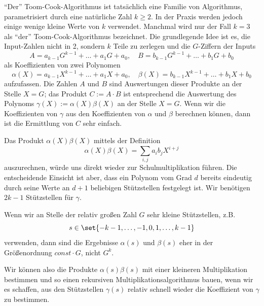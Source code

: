 \begin{remark}
    \enquote{Der} Toom-Cook-Algorithmus ist tatsächlich eine Familie von Algorithmus, parametrisiert durch eine natürliche Zahl $k\geq 2$. In der Praxis werden jedoch einige wenige kleine Werte von $k$ verwendet. Manchmal wird nur der Fall $k=3$ als \enquote{der} Toom-Cook-Algorithmus bezeichnet.
    \medskip
    Die grundlegende Idee ist es, die Input-Zahlen nicht in 2, sondern $k$ Teile zu zerlegen und die $G$-Ziffern der Inputs
    \[A = a_{k-1} G^{k-1} + \ldots + a_1 G + a_0, \quad B = b_{k-1} G^{k-1} + \ldots + b_1 G + b_0\]
    als Koeffizienten von zwei Polynomen
    \[\alpha(X) = a_{k-1} X^{k-1} + \ldots + a_1 X + a_0, \quad \beta(X) = b_{k-1} X^{k-1} + \ldots + b_1 X + b_0\]
    aufzufassen. Die Zahlen $A$ und $B$ sind Auswertungen dieser Produkte an der Stelle $X=G$; das Produkt $C:=A\cdot B$ ist entsprechend die Auswertung des Polynoms $\gamma(X):=\alpha(X)\beta(X)$ an der Stelle $X=G$. Wenn wir die Koeffizienten von $\gamma$ aus den Koeffizienten von $\alpha$ und $\beta$ berechnen können, dann ist die Ermittlung von $C$ sehr einfach.

    \smallskip
    Das Produkt $\alpha(X)\beta(X)$ mittels der Definition
    \[\alpha(X)\beta(X) = \sum_{i,j} a_i b_j X^{i+j}\]
    auszurechnen, würde uns direkt wieder zur Schulmultiplikation führen. Die entscheidende Einsicht ist aber, dass ein Polynom vom Grad $d$ bereits eindeutig durch seine Werte an $d+1$ beliebigen Stützstellen festgelegt ist. Wir benötigen $2k-1$ Stützstellen für $\gamma$.

    Wenn wir an Stelle der relativ großen Zahl $G$ sehr kleine Stützstellen, z.B.
    \[s\in\set{-k-1,\ldots,-1,0,1,\ldots,k-1}\]
    verwenden, dann sind die Ergebnisse $\alpha(s)$ und $\beta(s)$ eher in der Größenordnung $const\cdot G$, nicht $G^k$.

    Wir können also die Produkte $\alpha(s)\beta(s)$ mit einer kleineren Multiplikation bestimmen und so einen rekursiven Multiplikationsalgorithmus bauen, wenn wir es schaffen, aus den Stützstellen $\gamma(s)$ relativ schnell wieder die Koeffizient von $\gamma$ zu bestimmen.
\end{remark}

